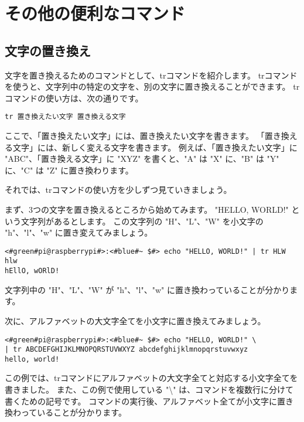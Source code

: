 \section{その他の便利なコマンド}

\subsection{文字の置き換え}
文字を置き換えるためのコマンドとして、trコマンドを紹介します。
trコマンドを使うと、文字列中の特定の文字を、別の文字に置き換えることができます。
trコマンドの使い方は、次の通りです。

\begin{lstlisting}[caption=trコマンドの使い方, label=tr_basic_usage]
tr 置き換えたい文字 置き換える文字
\end{lstlisting}

ここで、「置き換えたい文字」には、置き換えたい文字を書きます。
「置き換える文字」には、新しく変える文字を書きます。
例えば、「置き換えたい文字」に "ABC"、「置き換える文字」に "XYZ" を書くと、"A" は "X" に、"B" は "Y" に、"C" は "Z"
に置き換わります。

それでは、trコマンドの使い方を少しずつ見ていきましょう。

まず、3つの文字を置き換えるところから始めてみます。
"HELLO, WORLD!" という文字列があるとします。
この文字列の "H"、"L"、"W" を小文字の "h"、"l"、"w" に置き変えてみましょう。

\begin{lstlisting}[caption=3文字の置き換え, label=tr_3_chars]
<#green#pi@raspberrypi#>:<#blue#~ $#> echo "HELLO, WORLD!" | tr HLW hlw
hEllO, wORlD!
\end{lstlisting}

文字列中の "H"、"L"、"W" が "h"、"l"、"w" に置き換わっていることが分かります。

次に、アルファベットの大文字全てを小文字に置き換えてみましょう。

\begin{lstlisting}[caption=アルファベット全体の置き換え, label=tr_all_chars]
<#green#pi@raspberrypi#>:<#blue#~ $#> echo "HELLO, WORLD!" \
| tr ABCDEFGHIJKLMNOPQRSTUVWXYZ abcdefghijklmnopqrstuvwxyz
hello, world!
\end{lstlisting}

この例では、trコマンドにアルファベットの大文字全てと対応する小文字全てを書きました。
また、この例で使用している "\textbackslash" は、コマンドを複数行に分けて書くための記号です。
コマンドの実行後、アルファベット全てが小文字に置き換わっていることが分かります。

